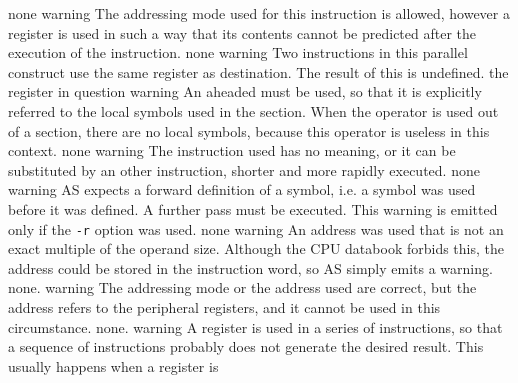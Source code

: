 \documentclass[12pt,twoside]{report}
\newcommand{\tty}[1]{{\tt #1}}
\newcommand{\asname}{{AS}}
\begin{document}
\begin{description}
               {none}
               {warning}
               {The addressing mode used for this instruction is allowed,
                however a register is used in such a way that its contents
                cannot be predicted after the execution of the
                instruction.}
               {none}
               {warning}
               {Two instructions in this parallel construct use the same
                register as destination.  The result of this is undefined.}
               {the register in question}
               {warning}
               {An aheaded \@ must be used, so that it is
                explicitly referred to the local symbols used in the
                section. When the operator is used out of a section, there
                are no local symbols, because this operator is useless in
                this context.}
               {none}
               {warning}
               {The instruction used has no meaning, or it can be
                substituted by an other instruction, shorter and more
                rapidly executed.}
               {none}
               {warning}
               {\asname{} expects a forward definition of a symbol, i.e. a symbol
                was used before it was defined. A further pass must be
                executed. This warning is emitted only if the \tty{-r} option was
                used.}
               {none}
               {warning}
               {An address was used that is not an exact multiple of the
                operand size. Although the CPU databook forbids this, the
                address could be stored in the instruction word, so \asname{}
                simply emits a warning.}
               {none.}
               {warning}
               {The addressing mode or the address used are correct, but the
                address refers to the peripheral registers, and it
                cannot be used in this circumstance.}
               {none.}
               {warning}
               {A register is used in a series of instructions, so that a
                sequence of instructions probably does not generate the
                desired result. This usually happens when a register is
}
\end{description}
\end{document}
